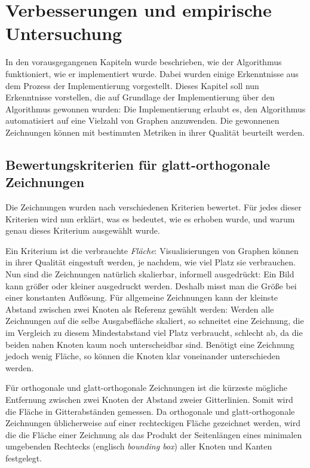 \documentclass[a4paper]{scrreprt}
\theoremstyle{definition}
\begin{document}
\chapter{Verbesserungen und empirische Untersuchung}

In den vorausgegangenen Kapiteln wurde beschrieben, wie der Algorithmus funktioniert, wie er implementiert wurde. Dabei wurden einige Erkenntnisse aus dem Prozess der Implementierung vorgestellt. Dieses Kapitel soll nun Erkenntnisse vorstellen, die auf Grundlage der Implementierung über den Algorithmus gewonnen wurden: Die Implementierung erlaubt es, den Algorithmus automatisiert auf eine Vielzahl von Graphen anzuwenden. Die gewonnenen Zeichnungen können mit bestimmten Metriken in ihrer Qualität beurteilt werden.

\section{Bewertungskriterien für glatt-orthogonale Zeichnungen}

Die Zeichnungen wurden nach verschiedenen Kriterien bewertet. Für jedes dieser Kriterien wird nun erklärt, was es bedeutet, wie es erhoben wurde, und warum genau dieses Kriterium ausgewählt wurde.

Ein Kriterium ist die verbrauchte \emph{Fläche}: Visualisierungen von Graphen können in ihrer Qualität eingestuft werden, je nachdem, wie viel Platz sie verbrauchen. Nun sind die Zeichnungen natürlich skalierbar, informell ausgedrückt: Ein Bild kann größer oder kleiner ausgedruckt werden. Deshalb misst man die Größe bei einer konstanten Auflösung. Für allgemeine Zeichnungen kann der kleinste Abstand zwischen zwei Knoten als Referenz gewählt werden: Werden alle Zeichnungen auf die selbe Ausgabefläche skaliert, so schneitet eine Zeichnung, die im Vergleich zu diesem Mindestabstand viel Platz verbraucht, schlecht ab, da die beiden nahen Knoten kaum noch unterscheidbar sind. Benötigt eine Zeichnung jedoch wenig Fläche, so können die Knoten klar voneinander unterschieden werden.

Für orthogonale und glatt-orthogonale Zeichnungen ist die kürzeste mögliche Entfernung zwischen zwei Knoten der Abstand zweier Gitterlinien. Somit wird die Fläche in Gitterabständen gemessen. Da orthogonale und glatt-orthogonale Zeichnungen üblicherweise auf einer rechteckigen Fläche gezeichnet werden, wird die die Fläche einer Zeichnung als das Produkt der Seitenlängen eines minimalen umgebenden Rechtecks (englisch \emph{bounding box}) aller Knoten und Kanten festgelegt.
\end{document}
